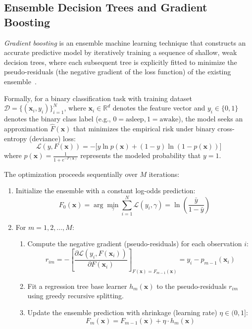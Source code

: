 \documentclass[journal,11pt,onecolumn]{IEEEtran}
\begin{document}
\subsection{Ensemble Decision Trees and Gradient Boosting}
\textit{Gradient boosting} is an ensemble machine learning technique that constructs an accurate predictive model by iteratively training a sequence of shallow, weak decision trees, where each subsequent tree is explicitly fitted to minimize the pseudo-residuals (the negative gradient of the loss function) of the existing ensemble~\cite{friedman2001greedy}.

Formally, for a binary classification task with training dataset $\mathcal{D} = \{(\mathbf{x}_i, y_i)\}_{i=1}^N$, where $\mathbf{x}_i \in \mathbb{R}^d$ denotes the feature vector and $y_i \in \{0, 1\}$ denotes the binary class label (e.g., $0 = \text{asleep}, 1 = \text{awake}$), the model seeks an approximation $\hat{F}(\mathbf{x})$ that minimizes the empirical risk under binary cross-entropy (deviance) loss:
\begin{equation}
\label{eq:deviance_loss}
\mathcal{L}(y, F(\mathbf{x})) = - \Big[ y \ln p(\mathbf{x}) + (1 - y) \ln(1 - p(\mathbf{x})) \Big]
\end{equation}
where $p(\mathbf{x}) = \frac{1}{1 + e^{-F(\mathbf{x})}}$ represents the modeled probability that $y=1$. 

The optimization proceeds sequentially over $M$ iterations:
\begin{enumerate}[leftmargin=*]
    \item Initialize the ensemble with a constant log-odds prediction:
    \begin{equation}
    F_0(\mathbf{x}) = \arg\min_{\gamma} \sum_{i=1}^N \mathcal{L}(y_i, \gamma) = \ln \left( \frac{\bar{y}}{1 - \bar{y}} \right)
    \end{equation}
    \item For $m = 1, 2, \dots, M$:
    \begin{enumerate}
        \item Compute the negative gradient (pseudo-residuals) for each observation $i$:
        \begin{equation}
        r_{im} = -\left[ \frac{\partial \mathcal{L}(y_i, F(\mathbf{x}_i))}{\partial F(\mathbf{x}_i)} \right]_{F(\mathbf{x}) = F_{m-1}(\mathbf{x})} = y_i - p_{m-1}(\mathbf{x}_i)
        \end{equation}
        \item Fit a regression tree base learner $h_m(\mathbf{x})$ to the pseudo-residuals $r_{im}$ using greedy recursive splitting.
        \item Update the ensemble prediction with shrinkage (learning rate) $\eta \in (0, 1]$:
        \begin{equation}
        F_m(\mathbf{x}) = F_{m-1}(\mathbf{x}) + \eta \cdot h_m(\mathbf{x})
        \end{equation}
    \end{enumerate}
\end{enumerate}
\end{document}
